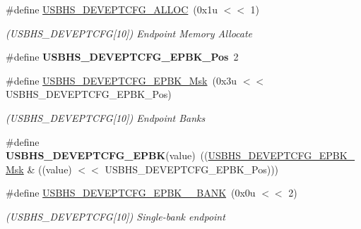 \begin{DoxyCompactItemize}
\#define \mbox{\hyperlink{group__SAMV71__USBHS_gaca800bdf4e2d323dcf1455b8c6b77941}{U\+S\+B\+H\+S\+\_\+\+D\+E\+V\+E\+P\+T\+C\+F\+G\+\_\+\+A\+L\+L\+OC}}~(0x1u $<$$<$ 1)
\begin{DoxyCompactList}\small\item\em (U\+S\+B\+H\+S\+\_\+\+D\+E\+V\+E\+P\+T\+C\+FG\mbox{[}10\mbox{]}) Endpoint Memory Allocate \end{DoxyCompactList}\item 
\mbox{\label{group__SAMV71__USBHS_ga9c204c7785eb0c1f229018919cdd962d}} 
\#define {\bfseries U\+S\+B\+H\+S\+\_\+\+D\+E\+V\+E\+P\+T\+C\+F\+G\+\_\+\+E\+P\+B\+K\+\_\+\+Pos}~2
\item 
\mbox{\label{group__SAMV71__USBHS_ga21ff629a9b5ae6ea0e8255180ca92df3}} 
\#define \mbox{\hyperlink{group__SAMV71__USBHS_ga21ff629a9b5ae6ea0e8255180ca92df3}{U\+S\+B\+H\+S\+\_\+\+D\+E\+V\+E\+P\+T\+C\+F\+G\+\_\+\+E\+P\+B\+K\+\_\+\+Msk}}~(0x3u $<$$<$ U\+S\+B\+H\+S\+\_\+\+D\+E\+V\+E\+P\+T\+C\+F\+G\+\_\+\+E\+P\+B\+K\+\_\+\+Pos)
\begin{DoxyCompactList}\small\item\em (U\+S\+B\+H\+S\+\_\+\+D\+E\+V\+E\+P\+T\+C\+FG\mbox{[}10\mbox{]}) Endpoint Banks \end{DoxyCompactList}\item 
\mbox{\label{group__SAMV71__USBHS_ga9bef4082a7cfc52ef17b3b669a605829}} 
\#define {\bfseries U\+S\+B\+H\+S\+\_\+\+D\+E\+V\+E\+P\+T\+C\+F\+G\+\_\+\+E\+P\+BK}(value)~((\mbox{\hyperlink{group__SAMV71__USBHS_ga21ff629a9b5ae6ea0e8255180ca92df3}{U\+S\+B\+H\+S\+\_\+\+D\+E\+V\+E\+P\+T\+C\+F\+G\+\_\+\+E\+P\+B\+K\+\_\+\+Msk}} \& ((value) $<$$<$ U\+S\+B\+H\+S\+\_\+\+D\+E\+V\+E\+P\+T\+C\+F\+G\+\_\+\+E\+P\+B\+K\+\_\+\+Pos)))
\item 
\mbox{\label{group__SAMV71__USBHS_gad917d30d65138878950a81c136360142}} 
\#define \mbox{\hyperlink{group__SAMV71__USBHS_gad917d30d65138878950a81c136360142}{U\+S\+B\+H\+S\+\_\+\+D\+E\+V\+E\+P\+T\+C\+F\+G\+\_\+\+E\+P\+B\+K\+\_\+\_\+\+B\+A\+NK}}~(0x0u $<$$<$ 2)
\begin{DoxyCompactList}\small\item\em (U\+S\+B\+H\+S\+\_\+\+D\+E\+V\+E\+P\+T\+C\+FG\mbox{[}10\mbox{]}) Single-\/bank endpoint \end{DoxyCompactList}\item 

\end{DoxyCompactItemize}
